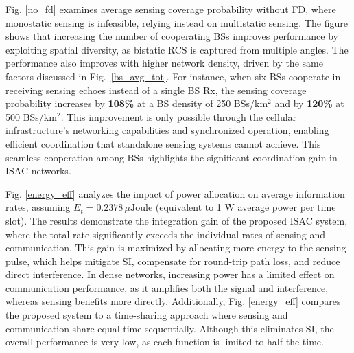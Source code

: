 \documentclass[journal]{IEEEtran}
\begin{document}
Fig. \ref{no_fd} examines average sensing coverage probability without FD, where monostatic sensing is infeasible, relying instead on multistatic sensing. The figure shows that increasing the number of cooperating BSs improves performance by exploiting spatial diversity, as bistatic RCS is captured from multiple angles. The performance also improves with higher network density, driven by the same factors discussed in Fig.~\ref{bs_avg_tot}.  For instance, when six BSs cooperate in receiving sensing echoes instead of a single BS Rx, the sensing coverage probability increases by \textbf{108\%} at a BS density of 250 BSs/km$^\text{2}$ and by \textbf{120\%} at 500 BSs/km$^\text{2}$. This improvement is only possible through the cellular infrastructure’s networking capabilities and synchronized operation, enabling efficient coordination that standalone sensing systems cannot achieve. This seamless cooperation among BSs highlights the significant coordination gain in ISAC networks.

















Fig. \ref{energy_eff} analyzes the impact of power allocation on average information rates, assuming \(E_t = 0.2378\,\mu\text{Joule}\) (equivalent to 1 W average power per time slot). The results demonstrate the integration gain of the proposed ISAC system, where the total rate significantly exceeds the individual rates of sensing and communication. This gain is maximized by allocating more energy to the sensing pulse, which helps mitigate SI, compensate for round-trip path loss, and reduce direct interference.
In dense networks, increasing power has a limited effect on communication performance, as it amplifies both the signal and interference, whereas sensing benefits more directly. Additionally, Fig. \ref{energy_eff} compares the proposed system to a time-sharing approach where sensing and communication share equal time sequentially. Although this eliminates SI, the overall performance is very low, as each function is limited to half the time.
\end{document}
